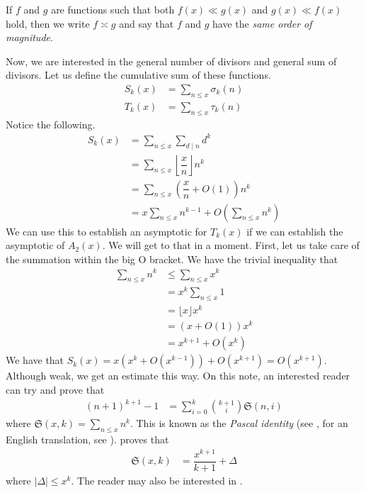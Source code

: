 \documentclass[elemannt.tex]{subfile}
\begin{document}
		\begin{definition}
			If $f$ and $g$ are functions such that both $f(x)\ll g(x)$ and $g(x)\ll f(x)$ hold, then we write $f\asymp g$ and say that $f$ and $g$ have the \textit{same order of magnitude}.
		\end{definition}\par
	Now, we are interested in the general number of divisors and general sum of divisors. Let us define the cumulative sum of these functions.
		\begin{align*}
			S_{k}(x)
				& = \sum_{n\leq x}\sigma_{k}(n)\\
			T_{k}(x)
				& = \sum_{n\leq x}\tau_{k}(n)
		\end{align*}
	Notice the following.
		\begin{align*}
			S_{k}(x)
				& = \sum_{n\leq x}\sum_{d\mid n}d^{k}\\
				& = \sum_{n\leq x}\left\lfloor{\dfrac{x}{n}}\right\rfloor n^{k}\\
				& = \sum_{n\leq x}\left(\dfrac{x}{n}+O(1)\right)n^{k}\\
				& = x\sum_{n\leq x}n^{k-1}+O\left(\sum_{n\leq x}n^{k}\right)
		\end{align*}
	We can use this to establish an asymptotic for $T_{k}(x)$ if we can establish the asymptotic of $A_{2}(x)$. We will get to that in a moment. First, let us take care of the summation within the big O bracket. We have the trivial inequality that
		\begin{align*}
			\sum_{n\leq x}n^{k}
				& \leq \sum_{n\leq x}x^{k}\\
				& = x^{k}\sum_{n\leq x}1\\
				& = \lfloor{x}\rfloor x^{k}\\
				& = (x+O(1))x^{k}\\
				& = x^{k+1}+O(x^{k})
		\end{align*}
	We have that $S_{k}(x)=x\left(x^{k}+O(x^{k-1})\right)+O(x^{k+1})=O(x^{k+1})$. Although weak, we get an estimate this way. On this note, an interested reader can try and prove that
		\begin{align*}
			(n+1)^{k+1}-1
				& =\sum_{i=0}^{k}\binom{k+1}{i}\mathfrak{S}(n,i)
		\end{align*}
	where $\mathfrak{S}(x,k)=\sum_{n\leq x}n^{k}$. This is known as the \textit{Pascal identity} (see \textcite{pascal_1964}, for an English translation, see \textcite{knoebel_laubenbacher_lodder_pengelley_2007}). \textcite[Chapter II, Theorem $1$]{lehmer_1900} proves that
		\begin{align}
			\mathfrak{S}(x,k)
				& = \dfrac{x^{k+1}}{k+1}+\Delta\label{eqn:lehmers}
		\end{align}
	where $|\Delta|\leq x^{k}$. The reader may also be interested in \textcite{kieren_macmillan_jonathan_sondow_2011}.
	
\end{document}
